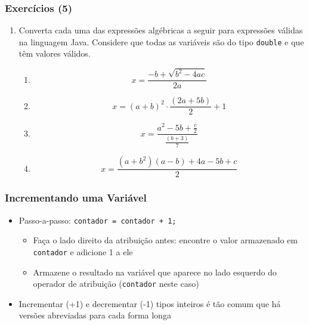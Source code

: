 \documentclass[xcolor={dvipsnames,table},aspectratio=169]{beamer}
\newcommand\setItemnumber[1]{\setcounter{enumi}{\numexpr#1-1\relax}}
\begin{document}
\begin{frame}[fragile]\frametitle{Exercícios (5)}
\begin{enumerate}
	\setItemnumber{6}
	\item Converta cada uma das expressões algébricas a seguir para expressões válidas na linguagem Java. Considere que todas as variáveis são do tipo \texttt{double} e que têm valores válidos.
	\begin{enumerate}[a]
		\item \[ x = \frac{-b+\sqrt{b^2-4ac}}{2a} \]
		\item \[ x = (a+b)^2 \cdot \frac{(2a+5b)}{2} + 1 \]
		\item \[ x = \frac{a^2 -5b + \frac{c}{2} }{ \frac{(b+3)}{7} } \]
		\item \[ x = \frac{(a+b^2)(a-b)+4a-5b+c}{2} \]
	\end{enumerate}
\end{enumerate}
\end{frame}




\begin{frame}\frametitle{Incrementando uma Variável}
\begin{itemize}
	\item Passo-a-passo: \texttt{contador = contador + 1;}
	\begin{itemize}
		\item Faça o lado direito da atribuição antes: encontre o valor armazenado em \texttt{contador} e adicione 1 a ele
		\item Armazene o resultado na variável que aparece no lado esquerdo do operador de atribuição (\texttt{contador} neste caso)
	\end{itemize}
	\item Incrementar (+1) e decrementar (-1) tipos inteiros é tão comum que há versões abreviadas para cada forma longa
\end{itemize}

\begin{center}
\end{center}
\end{frame}
\end{document}
